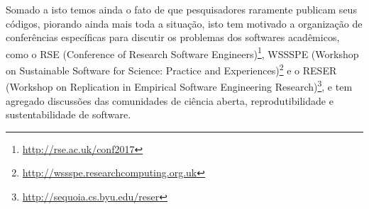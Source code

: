 %
%
%
%
% 

Somado a isto temos ainda o fato de que pesquisadores raramente publicam seus
códigos, piorando ainda mais toda a situação, isto tem motivado a organização
de conferências específicas para discutir os problemas dos softwares
acadêmicos, como o RSE (Conference of Research Software Engineers)\footnote{
\url{http://rse.ac.uk/conf2017}}, WSSSPE (Workshop on Sustainable Software for
Science: Practice and Experiences)\footnote{
\url{http://wssspe.researchcomputing.org.uk}} e o RESER (Workshop on
Replication in Empirical Software Engineering Research)\footnote{
\url{http://sequoia.cs.byu.edu/reser}}, e tem agregado discussões das
comunidades de ciência aberta, reprodutibilidade e sustentabilidade de
software.

